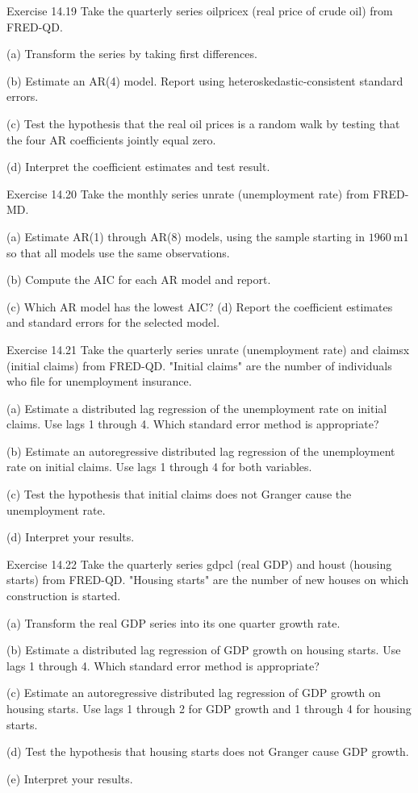 \documentclass[10pt]{article}
\begin{document}
Exercise 14.19 Take the quarterly series oilpricex (real price of crude oil) from FRED-QD.

(a) Transform the series by taking first differences.

(b) Estimate an AR(4) model. Report using heteroskedastic-consistent standard errors.

(c) Test the hypothesis that the real oil prices is a random walk by testing that the four AR coefficients jointly equal zero.

(d) Interpret the coefficient estimates and test result.

Exercise 14.20 Take the monthly series unrate (unemployment rate) from FRED-MD.

(a) Estimate AR(1) through AR(8) models, using the sample starting in $1960 \mathrm{~m} 1$ so that all models use the same observations.

(b) Compute the AIC for each AR model and report.

(c) Which AR model has the lowest AIC? (d) Report the coefficient estimates and standard errors for the selected model.

Exercise 14.21 Take the quarterly series unrate (unemployment rate) and claimsx (initial claims) from FRED-QD. "Initial claims" are the number of individuals who file for unemployment insurance.

(a) Estimate a distributed lag regression of the unemployment rate on initial claims. Use lags 1 through 4. Which standard error method is appropriate?

(b) Estimate an autoregressive distributed lag regression of the unemployment rate on initial claims. Use lags 1 through 4 for both variables.

(c) Test the hypothesis that initial claims does not Granger cause the unemployment rate.

(d) Interpret your results.

Exercise 14.22 Take the quarterly series gdpcl (real GDP) and houst (housing starts) from FRED-QD. "Housing starts" are the number of new houses on which construction is started.

(a) Transform the real GDP series into its one quarter growth rate.

(b) Estimate a distributed lag regression of GDP growth on housing starts. Use lags 1 through 4. Which standard error method is appropriate?

(c) Estimate an autoregressive distributed lag regression of GDP growth on housing starts. Use lags 1 through 2 for GDP growth and 1 through 4 for housing starts.

(d) Test the hypothesis that housing starts does not Granger cause GDP growth.

(e) Interpret your results.
\end{document}

